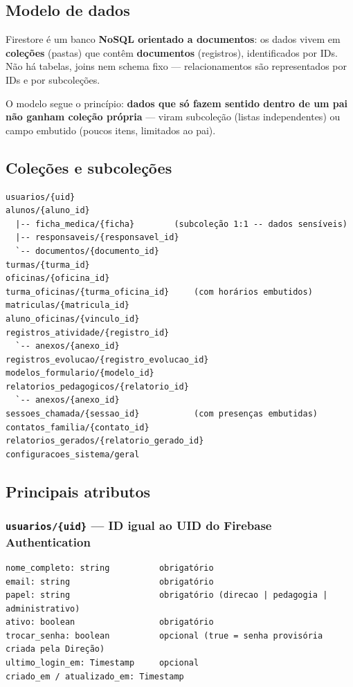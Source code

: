 \documentclass[a4paper,11pt]{article}
\begin{document}
\subsection{Modelo de dados}

Firestore é um banco \textbf{NoSQL orientado a documentos}: os dados vivem em \textbf{coleções} (pastas) que contêm \textbf{documentos} (registros), identificados por IDs. Não há tabelas, joins nem schema fixo --- relacionamentos são representados por IDs e por subcoleções.

O modelo segue o princípio: \textbf{dados que só fazem sentido dentro de um pai não ganham coleção própria} --- viram subcoleção (listas independentes) ou campo embutido (poucos itens, limitados ao pai).

\subsection{Coleções e subcoleções}

\begin{verbatim}
usuarios/{uid}
alunos/{aluno_id}
  |-- ficha_medica/{ficha}        (subcoleção 1:1 -- dados sensíveis)
  |-- responsaveis/{responsavel_id}
  `-- documentos/{documento_id}
turmas/{turma_id}
oficinas/{oficina_id}
turma_oficinas/{turma_oficina_id}     (com horários embutidos)
matriculas/{matricula_id}
aluno_oficinas/{vinculo_id}
registros_atividade/{registro_id}
  `-- anexos/{anexo_id}
registros_evolucao/{registro_evolucao_id}
modelos_formulario/{modelo_id}
relatorios_pedagogicos/{relatorio_id}
  `-- anexos/{anexo_id}
sessoes_chamada/{sessao_id}           (com presenças embutidas)
contatos_familia/{contato_id}
relatorios_gerados/{relatorio_gerado_id}
configuracoes_sistema/geral
\end{verbatim}

\subsection{Principais atributos}

\subsubsection*{\texttt{usuarios/\{uid\}} --- ID igual ao UID do Firebase Authentication}

\begin{verbatim}
nome_completo: string          obrigatório
email: string                  obrigatório
papel: string                  obrigatório (direcao | pedagogia | administrativo)
ativo: boolean                 obrigatório
trocar_senha: boolean          opcional (true = senha provisória criada pela Direção)
ultimo_login_em: Timestamp     opcional
criado_em / atualizado_em: Timestamp
\end{verbatim}
\end{document}
